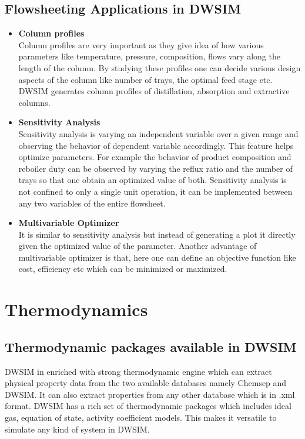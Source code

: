 \documentclass[12pt]{report}
\begin{document}
\subsection{Flowsheeting Applications in DWSIM}
\begin{itemize}
\item {\textbf{Column profiles}} \\
Column profiles are very important as they give idea of how various parameters like temperature, pressure, composition, flows vary along the length of the column. By studying these profiles one can decide various design aspects of the column like number of trays, the optimal feed stage etc. DWSIM generates column profiles of distillation, absorption and extractive columns.

\item{\textbf{Sensitivity Analysis}} \\
Sensitivity analysis is varying an independent variable over a given range and observing the behavior of dependent variable accordingly. This feature helps optimize parameters. For example the behavior of product composition and reboiler duty can be observed by varying the reflux ratio and the number of trays so that one obtain an optimized value of both. Sensitivity analysis is not confined to only a single unit operation, it can be implemented between any two variables of the entire flowsheet.

\item{\textbf{Multivariable Optimizer}} \\
It is similar to sensitivity analysis but instead of generating a plot it directly given the optimized value of the parameter. Another advantage of multivariable optimizer is that, here one can define an objective function like cost, efficiency etc which can be minimized or maximized.

\end{itemize}

\section{Thermodynamics}
\subsection{Thermodynamic packages available in DWSIM}
DWSIM in enriched with strong thermodynamic engine which can extract physical property data from the two available databases namely Chemsep and DWSIM. It can also extract properties from any other database which is in .xml format. DWSIM has a rich set of thermodynamic packages which includes ideal gas, equation of state, activity coefficient models. This makes it versatile to simulate any kind of system in DWSIM.
\end{document}
